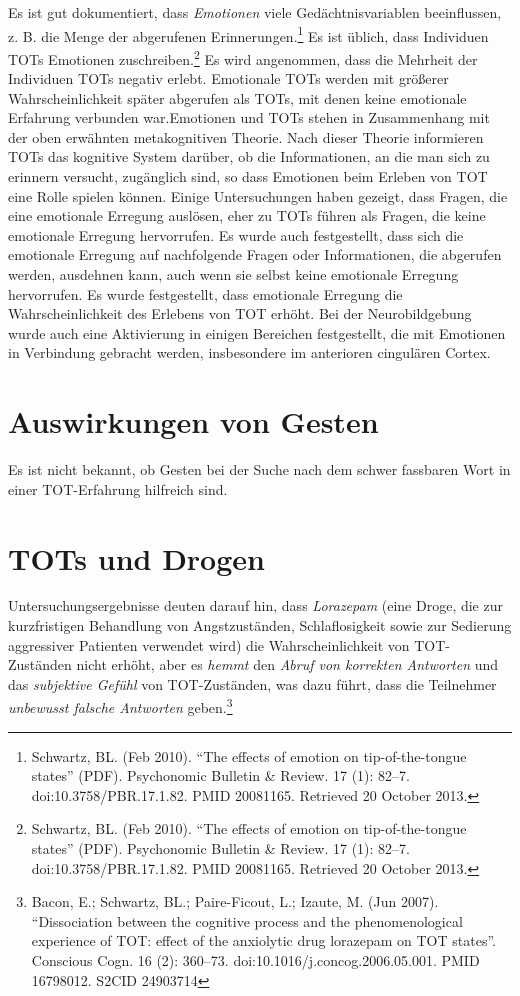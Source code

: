 \documentclass[
  letterpaper,
]{scrbook}
\begin{document}
Es ist gut dokumentiert, dass \emph{Emotionen} viele Gedächtnisvariablen
beeinflussen, z. B. die Menge der abgerufenen Erinnerungen.\footnote{Schwartz,
  BL. (Feb 2010). ``The effects of emotion on tip-of-the-tongue states''
  (PDF). Psychonomic Bulletin \& Review. 17 (1): 82--7.
  doi:10.3758/PBR.17.1.82. PMID 20081165. Retrieved 20 October 2013.} Es
ist üblich, dass Individuen TOTs Emotionen zuschreiben.\footnote{Schwartz,
  BL. (Feb 2010). ``The effects of emotion on tip-of-the-tongue states''
  (PDF). Psychonomic Bulletin \& Review. 17 (1): 82--7.
  doi:10.3758/PBR.17.1.82. PMID 20081165. Retrieved 20 October 2013.} Es
wird angenommen, dass die Mehrheit der Individuen TOTs negativ erlebt.
Emotionale TOTs werden mit größerer Wahrscheinlichkeit später abgerufen
als TOTs, mit denen keine emotionale Erfahrung verbunden war.Emotionen
und TOTs stehen in Zusammenhang mit der oben erwähnten metakognitiven
Theorie. Nach dieser Theorie informieren TOTs das kognitive System
darüber, ob die Informationen, an die man sich zu erinnern versucht,
zugänglich sind, so dass Emotionen beim Erleben von TOT eine Rolle
spielen können. Einige Untersuchungen haben gezeigt, dass Fragen, die
eine emotionale Erregung auslösen, eher zu TOTs führen als Fragen, die
keine emotionale Erregung hervorrufen. Es wurde auch festgestellt, dass
sich die emotionale Erregung auf nachfolgende Fragen oder Informationen,
die abgerufen werden, ausdehnen kann, auch wenn sie selbst keine
emotionale Erregung hervorrufen. Es wurde festgestellt, dass emotionale
Erregung die Wahrscheinlichkeit des Erlebens von TOT erhöht. Bei der
Neurobildgebung wurde auch eine Aktivierung in einigen Bereichen
festgestellt, die mit Emotionen in Verbindung gebracht werden,
insbesondere im anterioren cingulären Cortex.

\hypertarget{auswirkungen-von-gesten}{%
\section{Auswirkungen von Gesten}\label{auswirkungen-von-gesten}}

Es ist nicht bekannt, ob Gesten bei der Suche nach dem schwer fassbaren
Wort in einer TOT-Erfahrung hilfreich sind.

\hypertarget{tots-und-drogen}{%
\section{TOTs und Drogen}\label{tots-und-drogen}}

Untersuchungsergebnisse deuten darauf hin, dass \emph{Lorazepam} (eine
Droge, die zur kurzfristigen Behandlung von Angstzuständen,
Schlaflosigkeit sowie zur Sedierung aggressiver Patienten verwendet
wird) die Wahrscheinlichkeit von TOT-Zuständen nicht erhöht, aber es
\emph{hemmt} den \emph{Abruf von korrekten Antworten} und das
\emph{subjektive Gefühl} von TOT-Zuständen, was dazu führt, dass die
Teilnehmer \emph{unbewusst falsche Antworten} geben.\footnote{Bacon, E.;
  Schwartz, BL.; Paire-Ficout, L.; Izaute, M. (Jun 2007). ``Dissociation
  between the cognitive process and the phenomenological experience of
  TOT: effect of the anxiolytic drug lorazepam on TOT states''.
  Conscious Cogn. 16 (2): 360--73. doi:10.1016/j.concog.2006.05.001.
  PMID 16798012. S2CID 24903714}
\end{document}
